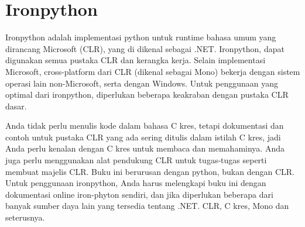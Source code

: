 \documentclass[12pt, times new roman, a4paper]{article}
\begin{document}
\section{Ironpython}
Ironpython adalah implementasi python untuk runtime bahasa umum yang dirancang Microsoft (CLR), yang di dikenal sebagai .NET. Ironpython, dapat digunakan semua pustaka CLR dan kerangka kerja. Selain implementasi Microsoft, cross-platform dari CLR (dikenal sebagai Mono) bekerja dengan sistem operasi lain non-Microsoft, serta dengan Windows. Untuk penggunaan yang optimal dari ironpython, diperlukan beberapa keakraban dengan pustaka CLR dasar.

Anda tidak perlu menulis kode dalam bahasa C kres, tetapi dokumentasi dan contoh untuk pustaka CLR yang ada sering ditulis dalam istilah C kres, jadi Anda perlu kenalan dengan C kres untuk membaca dan memahaminya. Anda juga perlu menggunakan alat pendukung CLR untuk tugas-tugas seperti membuat majelis CLR. Buku ini berurusan dengan python, bukan dengan CLR. Untuk penggunaan ironpython, Anda harus melengkapi buku ini dengan dokumentasi online iron-phyton sendiri, dan jika diperlukan beberapa dari banyak sumber daya lain yang tersedia tentang .NET. CLR, C kres, Mono dan seterusnya.
\end{document}
